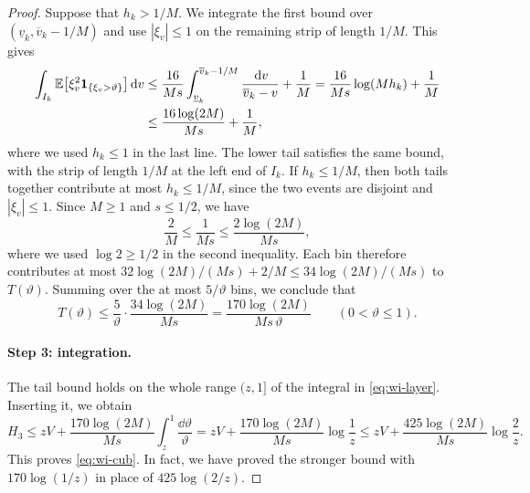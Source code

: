 \begin{proof}
Suppose that $h_k>1/M$. We integrate the first bound over
$(\underline v_k,\overline v_k-1/M)$ and use $|\xi_v|\le1$ on the
remaining strip of length $1/M$. This gives
\[
 \begin{aligned}
 \int_{I_k}\mathbb E\bigl[\xi_v^2\mathbf1_{\{\xi_v>\vartheta\}}\bigr]\,\mathrm d v
 &\le\frac{16}{Ms}\int_{\underline v_k}^{\overline v_k-1/M}
       \frac{\,\mathrm d v}{\overline v_k-v}+\frac1M
 =\frac{16}{Ms}\log(Mh_k)+\frac1M\\
 &\le\frac{16\log(2M)}{Ms}+\frac1M,
 \end{aligned}
\]
where we used $h_k\le1$ in the last line. The lower tail satisfies the
same bound, with the strip of length $1/M$ at the left end of $I_k$. If
$h_k\le1/M$, then both tails together contribute at most $h_k\le1/M$,
since the two events are disjoint and $|\xi_v|\le1$. Since $M\ge1$ and
$s\le1/2$, we have
\[
 \frac2M\le\frac1{Ms}\le\frac{2\log(2M)}{Ms},
\]
where we used $\log2\ge1/2$ in the second inequality. Each bin therefore
contributes at most $32\log(2M)/(Ms)+2/M\le34\log(2M)/(Ms)$ to
$T(\vartheta)$. Summing over the at most $5/\vartheta$ bins, we conclude that
\[
 T(\vartheta)\le\frac5\vartheta\cdot\frac{34\log(2M)}{Ms}
 =\frac{170\log(2M)}{Ms\,\vartheta}\qquad(0<\vartheta\le1).
\]

\paragraph{Step 3: integration.}
The tail bound holds on the whole range $(z,1]$ of the integral in
\eqref{eq:wi-layer}. Inserting it, we obtain
\[
 H_3\le zV+\frac{170\log(2M)}{Ms}\int_z^1\frac{\dd\vartheta}\vartheta
 =zV+\frac{170\log(2M)}{Ms}\log\frac1z
 \le zV+\frac{425\log(2M)}{Ms}\log\frac2z .
\]
This proves \eqref{eq:wi-cub}. In fact, we have proved the stronger
bound with $170\log(1/z)$ in place of $425\log(2/z)$.
\end{proof}

